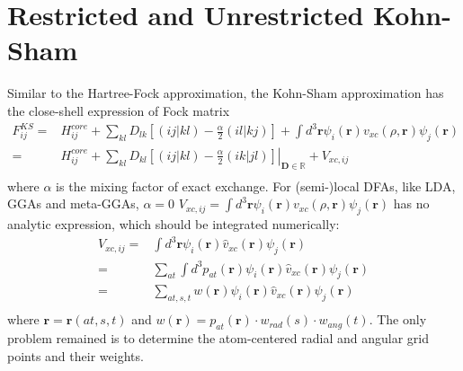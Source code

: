 \documentclass[a4paper,12pt]{article}
\begin{document}
\section{Restricted and Unrestricted Kohn-Sham}
Similar to the Hartree-Fock approximation, the Kohn-Sham approximation has the close-shell expression of Fock matrix
\begin{equation}
	\begin{split}
		F_{ij}^{KS}=&H_{ij}^{core}+\sum_{kl}D_{lk}\left[\left( ij|kl \right)-\frac{\alpha}{2}\left(il|kj  \right)\right]
		+\int d^3\textbf{r}\psi_i(\textbf{r})v_{xc}(\rho,\textbf{r})\psi_j(\textbf{r}) \\
	=&\left.H_{ij}^{core}+\sum_{kl}D_{kl}\left[\left( ij|kl \right)-\frac{\alpha}{2}\left(ik|jl  \right)\right]\right|_{\textbf{D} \in \mathbb{R}} 
	+V_{xc,ij} \\
    \end{split}
\end{equation}
where $\alpha$ is the mixing factor of exact exchange. For (semi-)local DFAs, like LDA, GGAs and meta-GGAs, $\alpha=0$
$V_{xc,ij}=\int d^3\textbf{r}\psi_i(\textbf{r})v_{xc}(\rho,\textbf{r})\psi_j(\textbf{r})$ has no analytic expression, which should be integrated numerically:
\begin{equation}
	\begin{split}
		V_{xc,ij} = &\int d^3\textbf{r}\psi_i(\textbf{r})\hat{v}_{xc}(\textbf{r})\psi_j(\textbf{r})\\
          = &\sum_{at}\int d^3p_{at}(\textbf{r})\psi_i(\textbf{r})\hat{v}_{xc}(\textbf{r})\psi_j(\textbf{r})\\
          = &\sum_{at,s,t}w(\textbf{r})\psi_i(\textbf{r})\hat{v}_{xc}(\textbf{r})\psi_j(\textbf{r})\\
	\end{split}
\end{equation}
where $\textbf{r}=\textbf{r}(at,s,t)$ and $w(\textbf{r})=p_{at}(\textbf{r})\cdot w_{rad}(s)\cdot w_{ang}(t)$.
The only problem remained is to determine the atom-centered radial and angular grid points and their weights.
\end{document}
